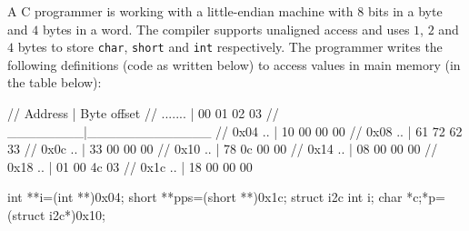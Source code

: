 \documentclass{supervision}
\begin{document}
\begin{questions}
  \question A C programmer is working with a little-endian machine with $8$
    bits in a byte and $4$ bytes in a word. The compiler supports unaligned
    access and uses $1$, $2$ and $4$ bytes to store \lstinline|char|,
    \lstinline|short| and \lstinline|int| respectively. The programmer writes
    the following definitions (code as written below) to access values in main
    memory (in the table below):

    \begin{cpp}[gobble=6]
      // Address | Byte offset
      // ....... | 00 01 02 03
      // ________|_____________
      // 0x04 .. | 10 00 00 00
      // 0x08 .. | 61 72 62 33
      // 0x0c .. | 33 00 00 00
      // 0x10 .. | 78 0c 00 00
      // 0x14 .. | 08 00 00 00
      // 0x18 .. | 01 00 4c 03
      // 0x1c .. | 18 00 00 00

      int **i=(int **)0x04;
      short **pps=(short **)0x1c;
      struct i2c {int i; char *c;}*p=(struct i2c*)0x10;
    \end{cpp}

\end{questions}
\end{document}
